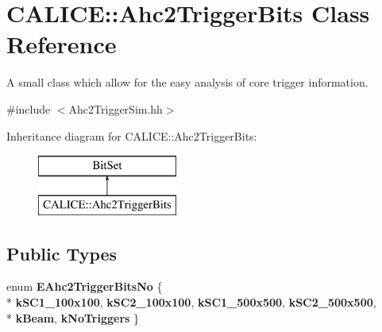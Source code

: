 \section{C\-A\-L\-I\-C\-E\-:\-:Ahc2\-Trigger\-Bits Class Reference}
\label{classCALICE_1_1Ahc2TriggerBits}


A small class which allow for the easy analysis of core trigger information.  




{\ttfamily \#include $<$Ahc2\-Trigger\-Sim.\-hh$>$}

Inheritance diagram for C\-A\-L\-I\-C\-E\-:\-:Ahc2\-Trigger\-Bits\-:\begin{figure}[H]
\begin{center}
\leavevmode
\includegraphics[height=2.000000cm]{classCALICE_1_1Ahc2TriggerBits}
\end{center}
\end{figure}
\subsection*{Public Types}
\begin{DoxyCompactItemize}
\item 
enum {\bfseries E\-Ahc2\-Trigger\-Bits\-No} \{ \\*
{\bfseries k\-S\-C1\-\_\-100x100}, 
{\bfseries k\-S\-C2\-\_\-100x100}, 
{\bfseries k\-S\-C1\-\_\-500x500}, 
{\bfseries k\-S\-C2\-\_\-500x500}, 
\\*
{\bfseries k\-Beam}, 
{\bfseries k\-No\-Triggers}
 \}
\end{DoxyCompactItemize}
